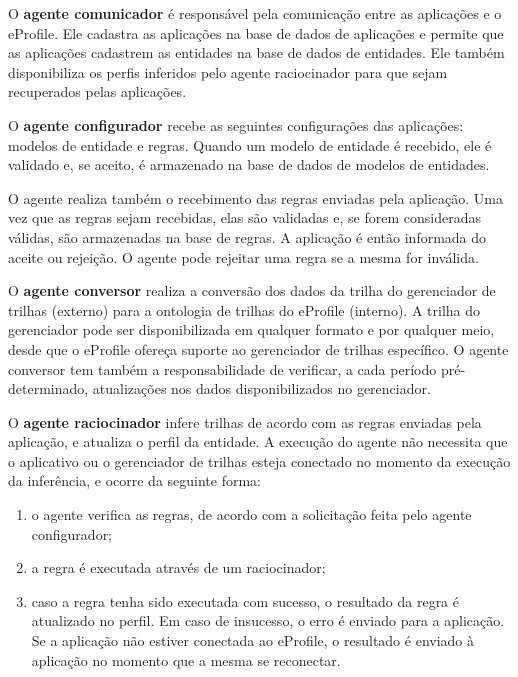 O \textbf{agente comunicador} é responsável pela comunicação entre as aplicações e o eProfile. Ele cadastra as aplicações na base de dados de aplicações e permite que as aplicações cadastrem as entidades na base de dados de entidades. Ele também disponibiliza os perfis inferidos pelo agente raciocinador para que sejam recuperados pelas aplicações.

O \textbf{agente configurador} recebe as seguintes configurações das aplicações: modelos de entidade e regras. Quando um modelo de entidade é recebido, ele é validado e, se aceito, é armazenado na base de dados de modelos de entidades.

O agente realiza também o recebimento das regras enviadas pela aplicação. Uma vez que as regras sejam recebidas, elas são validadas e, se forem consideradas válidas, são armazenadas na base de regras. A aplicação é então informada do aceite ou rejeição. O agente pode rejeitar uma regra se a mesma for inválida.

O \textbf{agente conversor} realiza a conversão dos dados da trilha do gerenciador de trilhas (externo) para a ontologia de trilhas do eProfile (interno). A trilha do gerenciador pode ser disponibilizada em qualquer formato e por qualquer meio, desde que o eProfile ofereça suporte ao gerenciador de trilhas específico. O agente conversor tem também a responsabilidade de verificar, a cada período pré-determinado, atualizações nos dados disponibilizados no gerenciador.

O \textbf{agente raciocinador} infere trilhas de acordo com as regras enviadas pela aplicação, e atualiza o perfil da entidade. A execução do agente não necessita que o aplicativo ou o gerenciador de trilhas esteja conectado no momento da execução da inferência, e ocorre da seguinte forma:

\begin{enumerate}

\item o agente verifica as regras, de acordo com a solicitação feita pelo agente configurador;

\item a regra é executada através de um raciocinador;

\item caso a regra tenha sido executada com sucesso, o resultado da regra é atualizado no perfil. Em caso de insucesso, o erro é enviado para a aplicação. Se a aplicação não estiver conectada ao eProfile, o resultado é enviado à aplicação no momento que a mesma se reconectar.

\end{enumerate}

